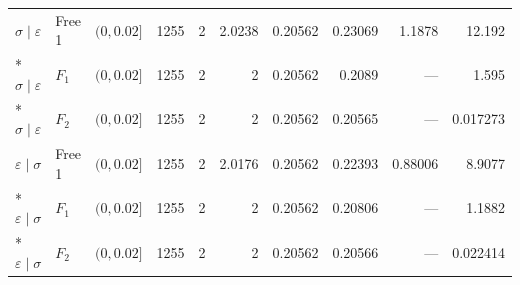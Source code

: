 \begin{longtable}{lllrrrrrrr}
\midrule
$\sigma\mid \varepsilon$ & Free 1 & $(0,0.02]$ & 1255 & 2 & 2.0238 & 0.20562 & 0.23069 & 1.1878 & 12.192\\*
$\sigma\mid \varepsilon$ & $F_1$ & $(0,0.02]$ & 1255 & 2 & 2 & 0.20562 & 0.2089 & --- & 1.595\\*
$\sigma\mid \varepsilon$ & $F_2$ & $(0,0.02]$ & 1255 & 2 & 2 & 0.20562 & 0.20565 & --- & 0.017273\\
\midrule
$\varepsilon\mid \sigma$ & Free 1 & $(0,0.02]$ & 1255 & 2 & 2.0176 & 0.20562 & 0.22393 & 0.88006 & 8.9077\\*
$\varepsilon\mid \sigma$ & $F_1$ & $(0,0.02]$ & 1255 & 2 & 2 & 0.20562 & 0.20806 & --- & 1.1882\\*
$\varepsilon\mid \sigma$ & $F_2$ & $(0,0.02]$ & 1255 & 2 & 2 & 0.20562 & 0.20566 & --- & 0.022414\\
\end{longtable}
\endgroup
